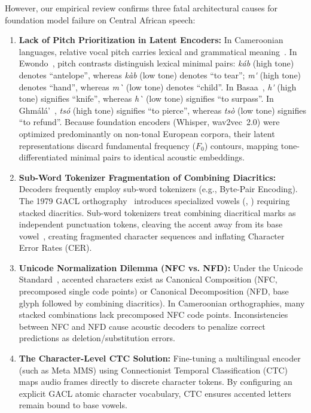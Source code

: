 \documentclass[conference]{IEEEtran}
\begin{document}
However, our empirical review confirms three fatal architectural causes for foundation model failure on Central African speech:
\begin{enumerate}
    \item \textbf{Lack of Pitch Prioritization in Latent Encoders:} In Cameroonian languages, relative vocal pitch carries lexical and grammatical meaning~\cite{tadadjeu1979alphabet}. In Ewondo~\cite{tadadjeu1979alphabet}, pitch contrasts distinguish lexical minimal pairs: \textit{k\'ab} (high tone) denotes ``antelope'', whereas \textit{k\`ab} (low tone) denotes ``to tear''; \textit{m\'\textopeno} (high tone) denotes ``hand'', whereas \textit{m\`\textopeno} (low tone) denotes ``child''. In Basaa~\cite{tadadjeu1979alphabet}, \textit{h\'\textepsilon} (high tone) signifies ``knife'', whereas \textit{h\`\textepsilon} (low tone) signifies ``to surpass''. In Gh\textopeno m\'al\'a'~\cite{tadadjeu1979alphabet}, \textit{ts\'o} (high tone) signifies ``to pierce'', whereas \textit{ts\`o} (low tone) signifies ``to refund''. Because foundation encoders (Whisper, wav2vec~2.0) were optimized predominantly on non-tonal European corpora, their latent representations discard fundamental frequency ($F_0$) contours, mapping tone-differentiated minimal pairs to identical acoustic embeddings.
    \item \textbf{Sub-Word Tokenizer Fragmentation of Combining Diacritics:} Decoders frequently employ sub-word tokenizers (e.g., Byte-Pair Encoding). The 1979 GACL orthography~\cite{tadadjeu1979alphabet} introduces specialized vowels (\textopeno, \textschwa) requiring stacked diacritics. Sub-word tokenizers treat combining diacritical marks as independent punctuation tokens, cleaving the accent away from its base vowel~\cite{nekoto2020participatory}, creating fragmented character sequences and inflating Character Error Rates (CER).
    \item \textbf{Unicode Normalization Dilemma (NFC vs. NFD):} Under the Unicode Standard~\cite{unicode2024standard}, accented characters exist as Canonical Composition (NFC, precomposed single code points) or Canonical Decomposition (NFD, base glyph followed by combining diacritics). In Cameroonian orthographies, many stacked combinations lack precomposed NFC code points. Inconsistencies between NFC and NFD cause acoustic decoders to penalize correct predictions as deletion/substitution errors.
    \item \textbf{The Character-Level CTC Solution:} Fine-tuning a multilingual encoder (such as Meta MMS) using Connectionist Temporal Classification (CTC)~\cite{graves2006connectionist} maps audio frames directly to discrete character tokens. By configuring an explicit GACL atomic character vocabulary, CTC ensures accented letters remain bound to base vowels.
\end{enumerate}
\end{document}
